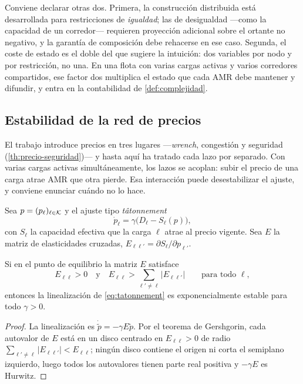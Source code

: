 \begin{observacion}
\label{obs:multiplicadores-limites}
Conviene declarar otras dos. Primera, la construcción distribuida está
desarrollada para restricciones de \emph{igualdad}; las de desigualdad —como la
capacidad de un corredor— requieren proyección adicional sobre el ortante no
negativo, y la garantía de composición debe rehacerse en ese caso. Segunda, el
coste de estado es el doble del que sugiere la intuición: dos variables por nodo
y por restricción, no una. En una flota con varias cargas activas y varios
corredores compartidos, ese factor dos multiplica el estado que cada AMR debe
mantener y difundir, y entra en la contabilidad de \cref{def:complejidad}.
\end{observacion}

\figLazo

\subsection{Estabilidad de la red de precios}

El trabajo introduce precios en tres lugares —\emph{wrench}, congestión y
seguridad (\cref{th:precio-seguridad})— y hasta aquí ha tratado cada lazo por
separado. Con varias cargas activas simultáneamente, los lazos se acoplan: subir
el precio de una carga atrae AMR que otra pierde. Esa interacción puede
desestabilizar el ajuste, y conviene enunciar cuándo no lo hace.

Sea $p=(p_\ell)_{\ell\in\mathcal{K}}$ y el ajuste tipo \emph{tâtonnement}
\begin{equation}
  \dot p_\ell=\gamma\bigl(D_\ell-S_\ell(p)\bigr),
  \label{eq:tatonnement}
\end{equation}
con $S_\ell$ la capacidad efectiva que la carga $\ell$ atrae al precio vigente.
Sea $E$ la matriz de elasticidades cruzadas, $E_{\ell\ell'}=\partial S_\ell/\partial p_{\ell'}$.

\begin{proposicion}
\label{pr:dominancia}
Si en el punto de equilibrio la matriz $E$ satisface
\[
  E_{\ell\ell}>0
  \quad\text{y}\quad
  E_{\ell\ell}>\sum_{\ell'\neq\ell}\bigl|E_{\ell\ell'}\bigr|
  \qquad\text{para todo }\ell,
\]
entonces la linealización de \eqref{eq:tatonnement} es exponencialmente estable
para todo $\gamma>0$.
\end{proposicion}

\begin{proof}
La linealización es $\dot{\tilde p}=-\gamma E\tilde p$. Por el teorema de
Gershgorin, cada autovalor de $E$ está en un disco centrado en $E_{\ell\ell}>0$
de radio $\sum_{\ell'\neq\ell}|E_{\ell\ell'}|<E_{\ell\ell}$; ningún disco
contiene el origen ni corta el semiplano izquierdo, luego todos los autovalores
tienen parte real positiva y $-\gamma E$ es Hurwitz.
\end{proof}

